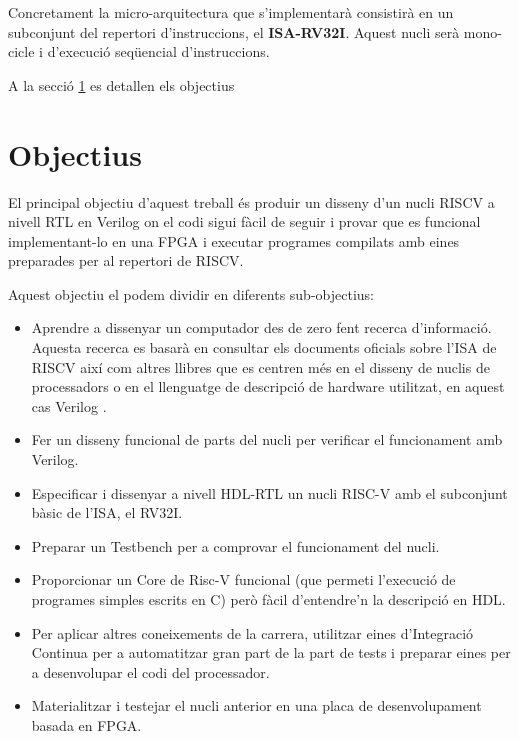 \documentclass[10pt,a4paper,twocolumn,twoside]{article}
\begin{document}
Concretament la micro-arquitectura que s'implementarà consistirà en un subconjunt del repertori d’instruccions, el \textbf{ISA-RV32I}. 
Aquest nucli serà mono-cicle i d’execució seqüencial d’instruccions. 

A la secció \ref{sec:Obj} es detallen els objectius





\section{Objectius} 
\label{sec:Obj}
El principal objectiu d'aquest treball és produir un disseny d'un nucli RISCV a nivell RTL en Verilog on el codi sigui fàcil de seguir i provar que es funcional implementant-lo en una FPGA i executar programes compilats amb eines preparades per al repertori de RISCV.

Aquest objectiu el podem dividir en diferents sub-objectius:

\begin{itemize}

    \item Aprendre a dissenyar un computador des de zero fent recerca d'informació. Aquesta recerca es basarà en consultar els documents oficials sobre l'ISA de RISCV \cite{waterman_volume_2019} \cite{waterman_volume_2019-1}  així com altres llibres que es centren més en el disseny de nuclis de processadors \cite{patterson_computer_2018} o en el llenguatge de descripció de hardware utilitzat, en aquest cas Verilog \cite{li_implementing_2018}.
    
    \item Fer un disseny funcional de parts del nucli per verificar el funcionament amb Verilog.

    \item Especificar i dissenyar a nivell HDL-RTL un nucli RISC-V amb el subconjunt bàsic de l’ISA, el RV32I.
    
    \item Preparar un Testbench per a comprovar el funcionament del nucli.
    
    \item Proporcionar un Core de Risc-V funcional (que permeti l'execució de programes simples escrits en C) però fàcil d'entendre'n la descripció en HDL.
    
    \item Per aplicar altres coneixements de la carrera, utilitzar eines d'Integració Continua per a automatitzar gran part de la part de tests i preparar eines per a desenvolupar el codi del processador.
    
    \item Materialitzar i testejar el nucli anterior en una placa de desenvolupament basada en FPGA.
    
        
\end{itemize}
\end{document}

